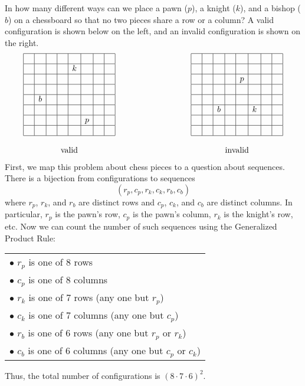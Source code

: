In how many different ways can we place a pawn ($p$), a knight ($k$),
and a bishop ($b$) on a chessboard so that no two pieces share a row
or a column?  A valid configuration is shown below on the left,
and an invalid configuration is shown on the right.
%
\[
\begin{array}{ccc}
\begin{array}{|c|c|c|c|c|c|c|c|}
\hline
\ &\ &\ &\ &\ &\ &\ &\ \\ \hline
 & & & &k& & & \\ \hline
 & & & & & & & \\ \hline
 & & & & & & & \\ \hline
 &b& & & & & & \\ \hline
 & & & & & & & \\ \hline
 & & & & &p& & \\ \hline
 & & & & & & & \\ \hline
\end{array}
& \hspace{1in} &
\begin{array}{|c|c|c|c|c|c|c|c|}
\hline
\ &\ &\ &\ &\ &\ &\ &\ \\ \hline
 & & & & & & & \\ \hline
 & & & &p& & & \\ \hline
 & & & & & & & \\ \hline
 & & & & & & & \\ \hline
 & &b& & &k& & \\ \hline
 & & & & & & & \\ \hline
 & & & & & & & \\ \hline
\end{array} \\
\\
\text{valid} & & \text{invalid}
\end{array}
\]
%
First, we map this problem about chess pieces to a question about
sequences.  There is a bijection from configurations to sequences
%
\[
(r_p, c_p, r_k, c_k, r_b, c_b)
\]
%
where $r_p$, $r_k$, and $r_b$ are distinct rows and $c_p$, $c_k$, and
$c_b$ are distinct columns.  In particular, $r_p$ is the pawn's row,
$c_p$ is the pawn's column, $r_k$ is the knight's row, etc.  Now we
can count the number of such sequences using the Generalized Product
Rule:
%
\begin{center}
\begin{tabular}{l}
$\bullet$ $r_p$ is one of 8 rows \\
$\bullet$ $c_p$ is one of 8 columns \\
$\bullet$ $r_k$ is one of 7 rows (any one but $r_p$) \\
$\bullet$ $c_k$ is one of 7 columns (any one but $c_p$) \\
$\bullet$ $r_b$ is one of 6 rows (any one but $r_p$ or $r_k$) \\
$\bullet$ $c_b$ is one of 6 columns (any one but $c_p$ or $c_k$)
\end{tabular}
\end{center}
%
\noindent Thus, the total number of configurations is $(8 \cdot 7
\cdot 6)^2$.

